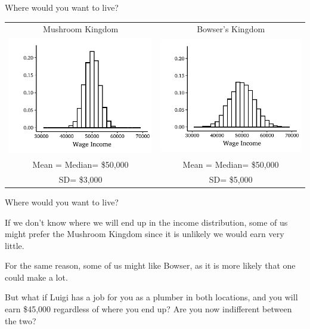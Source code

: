 \documentclass{./../div_teaching_slides}
\begin{document}
\begin{frame}{Where would you want to live?}
\centering \vspace{-0.5em}
\begin{tabular}{cc}
Mushroom Kingdom  & Bowser's Kingdom \\
\includegraphics{./../../Output/income_mk.pdf} &
\includegraphics{./../../Output/income_bk.pdf} \\ 
Mean = Median= \$50,000 & Mean = Median= \$50,000 \\
SD= \$3,000 & SD= \$5,000 \\
\end{tabular}
\end{frame}

\begin{frame}{Where would you want to live?}
\begin{witemize}
  \item If we don't know where we will end up in the income distribution, some of us might prefer the Mushroom Kingdom since it is unlikely we would earn very little. 
  \item For the same reason, some of us might like Bowser, as it is more likely that one could make a lot.
  \item But what if Luigi has a job for you as a plumber in both locations, and you will earn \$45,000 regardless of where you end up? Are you now indifferent between the two?
\end{witemize}
\end{frame}
\end{document}
